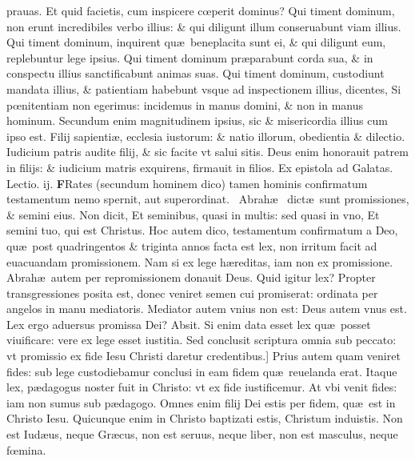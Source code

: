 \documentclass[a5paper,10pt]{book}
\def\leftmarginnote{%
	\lrmarginnote{\hskip -\marginparsep \hskip -6.5em}}
\def\rightmarginnote{%
	\lrmarginnote{\hskip\columnwidth \hskip -1em}}
\def\ae{æ}
\def\oe{œ}
\begin{document}
\begin{multicols*}{2}
prauas. Et quid facietis, cum inspicere c\oe perit dominus?
Qui timent dominum, non erunt incredibiles verbo illius: \& qui diligunt illum conseruabunt viam illius. Qui timent dominum, inquirent qu\ae \ beneplacita sunt ei, \& qui diligunt eum, replebuntur lege ipsius.
Qui timent dominum pr\ae parabunt corda sua, \& in conspectu illius sanctificabunt animas suas.
Qui timent dominum, custodiunt mandata illius, \& patientiam habebunt vsque ad inspectionem illius, dicentes, Si p\oe nitentiam non egerimus: incidemus in manus domini, \& non in manus hominum.
Secundum enim magnitudinem ipsius, sic \& misericordia illius cum ipso est.
Filij\rightmarginnote{ca. 3.} sapienti\ae , ecclesia iustorum: \& natio illorum, obedientia \& dilectio.
Iudicium patris audite filij, \& sic facite vt salui sitis. Deus enim honorauit patrem in filijs: \& iudicium matris exquirens, firmauit in filios.
\newline \color{red} Ex epistola ad Galatas. \hfill Lectio. ij. \color{black}
\vspace{-.25em}
\lettrine[lines=2]{\bfseries \color{red} F}{}Rates\rightmarginnote{ca. 3.} (secundum hominem dico) tamen hominis confirmatum testamentum nemo spernit, aut superordinat. \textdagger \ 
Abrah\ae \ \rightmarginnote{B}dict\ae \ sunt promissiones, \& semini eius. Non dicit, Et seminibus, quasi in multis: sed quasi in vno, Et semini tuo, qui est Christus.
Hoc autem dico, testamentum confirmatum a Deo, qu\ae \ post quadringentos \& triginta annos facta est lex, non irritum facit ad euacuandam promissionem.
Nam si ex lege h\ae reditas, iam non ex promissione. Abrah\ae \ autem per repromissionem donauit Deus. Quid igitur lex? Propter transgressiones posita est, donec veniret semen cui promiserat: ordinata per angelos in manu mediatoris.
Mediator autem vnius non est: Deus autem vnus est.
Lex ergo aduersus promissa Dei? Absit. Si enim data esset lex qu\ae \ posset viuificare: vere ex lege esset iustitia.
Sed conclusit scriptura omnia sub peccato: vt promissio ex fide Iesu Christi daretur credentibus.]
Prius\leftmarginnote{\begin{flushright}C\end{flushright}} autem quam veniret fides: sub lege custodiebamur conclusi in eam fidem qu\ae \ reuelanda erat.
Itaque lex, p\ae dagogus noster fuit in Christo: vt ex fide iustificemur. At vbi venit fides: iam non sumus sub p\ae dagogo.
Omnes enim filij Dei estis per fidem, qu\ae \ est in Christo Iesu. Quicunque enim in Christo baptizati estis, Christum induistis.
Non est Iud\ae us,
neque Gr\ae cus, non est seruus, neque liber, non est masculus, neque f\oe mina.

\end{multicols*}
\end{document}
